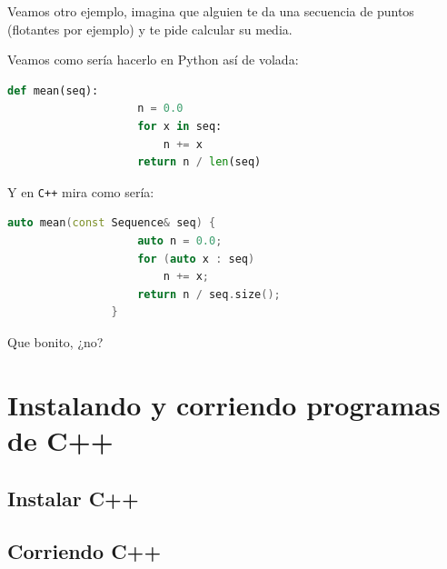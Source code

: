 \documentclass[12pt, fleqn]{report}                             %
\theoremstyle{break}                                            %
\newcommand{\textCode}[1]  { \texttt{#1} }                      %
\newcommand{\Cpp}{\ignorespaces\textCode{C++}}                  %
\begin{document}
            Veamos otro ejemplo, imagina que alguien te da una secuencia de 
            puntos (flotantes por ejemplo) y te pide calcular su media.

            Veamos como sería hacerlo en Python así de volada:
            \begin{lstlisting}[language=python, gobble=16]
                def mean(seq):
                    n = 0.0
                    for x in seq:
                        n += x
                    return n / len(seq)
            \end{lstlisting}

            Y en \Cpp mira como sería:
            \begin{lstlisting}[language=C++, gobble=16]
                auto mean(const Sequence& seq) {
                    auto n = 0.0;
                    for (auto x : seq)
                        n += x;
                    return n / seq.size();
                }
            \end{lstlisting}

            Que bonito, ¿no?
            \cite{ModernCppWhatYouNeedToKnow}

    \clearpage
    \chapter{Instalando y corriendo programas de C++}

        \clearpage
        \section{Instalar C++}

        \clearpage
        \section{Corriendo C++}
\end{document}
